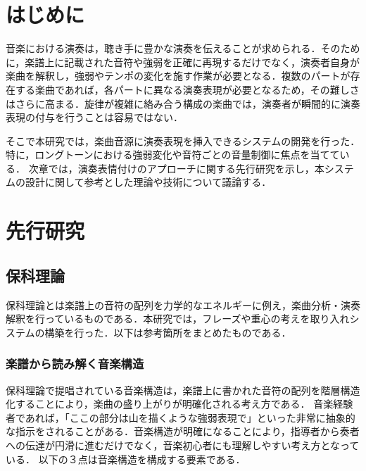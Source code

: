 



\section{はじめに}

音楽における演奏は，聴き手に豊かな演奏を伝えることが求められる．そのために，楽譜上に記載された音符や強弱を正確に再現するだけでなく，演奏者自身が楽曲を解釈し，強弱やテンポの変化を施す作業が必要となる．複数のパートが存在する楽曲であれば，各パートに異なる演奏表現が必要となるため，その難しさはさらに高まる．旋律が複雑に絡み合う構成の楽曲では，演奏者が瞬間的に演奏表現の付与を行うことは容易ではない．

そこで本研究では，楽曲音源に演奏表現を挿入できるシステムの開発を行った．特に，ロングトーンにおける強弱変化や音符ごとの音量制御に焦点を当てている． 次章では，演奏表情付けのアプローチに関する先行研究を示し，本システムの設計に関して参考とした理論や技術について議論する．



\section{先行研究}
\subsection{保科理論}
保科理論\cite{Hoshina98}とは楽譜上の音符の配列を力学的なエネルギーに例え，楽曲分析・演奏解釈を行っているものである．本研究では，フレーズや重心の考えを取り入れシステムの構築を行った．以下は参考箇所をまとめたものである．

\subsubsection{楽譜から読み解く音楽構造}
保科理論で提唱されている音楽構造は，楽譜上に書かれた音符の配列を階層構造化することにより，楽曲の盛り上がりが明確化される考え方である．
音楽経験者であれば，「ここの部分は山を描くような強弱表現で」といった非常に抽象的な指示をされることがある．音楽構造が明確になることにより，指導者から奏者への伝達が円滑に進むだけでなく，音楽初心者にも理解しやすい考え方となっている．
以下の３点は音楽構造を構成する要素である．

